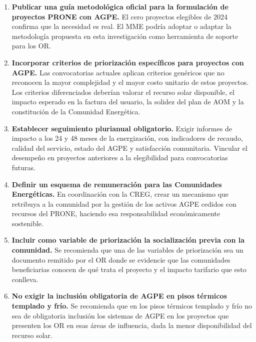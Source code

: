 \begin{enumerate}[label=\textbf{\arabic*.}, leftmargin=1.8cm, itemsep=8pt]

    \item \textbf{Publicar una guía metodológica oficial para la
    formulación de proyectos PRONE con AGPE.} El cero proyectos elegibles
    de 2024 confirma que la necesidad es real. El MME podría adoptar
    o adaptar la metodología propuesta en esta investigación como
    herramienta de soporte para los OR.

    \item \textbf{Incorporar criterios de priorización específicos para
    proyectos con AGPE.} Las convocatorias actuales aplican criterios
    genéricos que no reconocen la mayor complejidad y el mayor costo
    unitario de estos proyectos. Los criterios diferenciados deberían
    valorar el recurso solar disponible, el impacto esperado en la
    factura del usuario, la solidez del plan de AOM y la constitución
    de la Comunidad Energética.

    \item \textbf{Establecer seguimiento plurianual obligatorio.} Exigir
    informes de impacto a los 24 y 48 meses de la energización, con
    indicadores de recaudo, calidad del servicio, estado del AGPE y
    satisfacción comunitaria. Vincular el desempeño en proyectos
    anteriores a la elegibilidad para convocatorias futuras.

    \item \textbf{Definir un esquema de remuneración para las Comunidades
    Energéticas.} En coordinación con la CREG, crear un mecanismo que
    retribuya a la comunidad por la gestión de los activos AGPE cedidos
    con recursos del PRONE, haciendo esa responsabilidad económicamente
    sostenible.

    \item \textbf{Incluir como variable de priorización la socialización
    previa con la comunidad.} Se recomienda que una de las variables de
    priorización sea un documento remitido por el OR donde se evidencie
    que las comunidades beneficiarias conocen de qué trata el proyecto y
    el impacto tarifario que esto conlleva.

    \item \textbf{No exigir la inclusión obligatoria de AGPE en pisos
    térmicos templado y frío.} Se recomienda que en los pisos térmicos
    templado y frío no sea de obligatoria inclusión los sistemas de AGPE
    en los proyectos que presenten los OR en esas áreas de influencia,
    dada la menor disponibilidad del recurso solar.
\end{enumerate}

